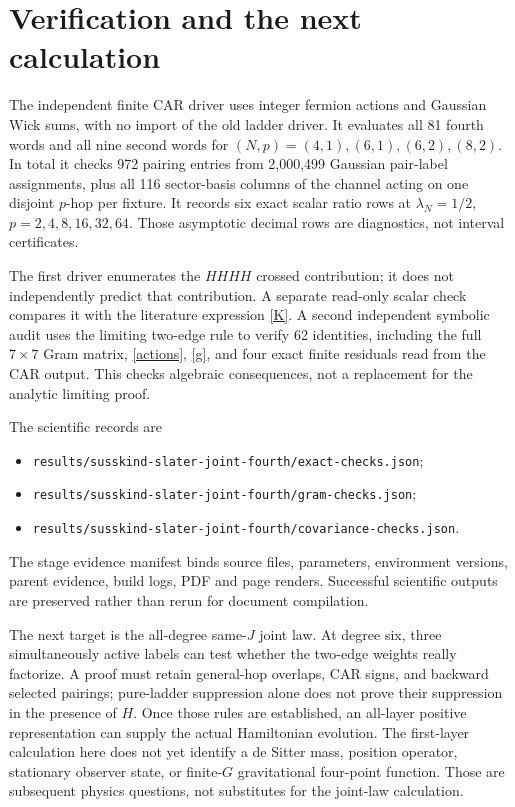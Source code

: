 \documentclass[11pt]{article}
\begin{document}
\newpage
\section{Verification and the next calculation}
The independent finite CAR driver uses integer fermion actions
and Gaussian Wick sums, with no import of the old ladder driver.
It evaluates all 81 fourth words and all nine second words for
$(N,p)=(4,1),(6,1),(6,2),(8,2)$. In total it checks 972 pairing
entries from 2,000,499 Gaussian pair-label assignments, plus all
116 sector-basis columns of the channel acting on one disjoint
$p$-hop per fixture. It records six exact scalar ratio rows at
$\lambda_N=1/2$, $p=2,4,8,16,32,64$. Those asymptotic decimal
rows are diagnostics, not interval certificates.

The first driver enumerates the $HHHH$ crossed contribution; it
does not independently predict that contribution. A separate
read-only scalar check compares it with the literature expression
\eqref{K}. A second independent symbolic audit uses the limiting
two-edge rule to verify 62 identities, including the full $7\times7$
Gram matrix, \eqref{actions}, \eqref{g}, and four exact finite
residuals read from the CAR output. This checks algebraic
consequences, not a replacement for the analytic limiting proof.

The scientific records are
\begin{itemize}
 \item \texttt{results/susskind-slater-joint-fourth/exact-checks.json};
 \item \texttt{results/susskind-slater-joint-fourth/gram-checks.json};
 \item \texttt{results/susskind-slater-joint-fourth/covariance-checks.json}.
\end{itemize}
The stage evidence manifest binds source files, parameters,
environment versions, parent evidence, build logs, PDF and page
renders. Successful scientific outputs are preserved rather than
rerun for document compilation.

The next target is the all-degree same-$J$ joint law. At degree six,
three simultaneously active labels can test whether the two-edge
weights really factorize. A proof must retain general-hop overlaps,
CAR signs, and backward selected pairings; pure-ladder suppression
alone does not prove their suppression in the presence of $H$.
Once those rules are established, an all-layer positive
representation can supply the actual Hamiltonian evolution.
The first-layer calculation here does not yet identify a de Sitter
mass, position operator, stationary observer state, or finite-$G$
gravitational four-point function. Those are subsequent physics
questions, not substitutes for the joint-law calculation.
\end{document}
